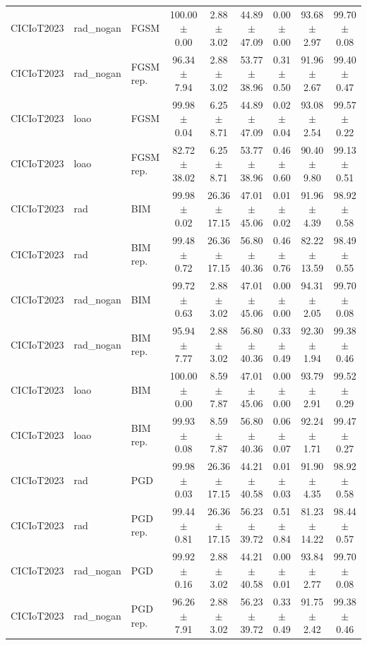 \begin{table}[t]
\begin{tabular}{lllcccccc}
CICIoT2023 & rad\_nogan & FGSM & 100.00 $\pm$ 0.00 & 2.88 $\pm$ 3.02 & 44.89 $\pm$ 47.09 & 0.00 $\pm$ 0.00 & 93.68 $\pm$ 2.97 & 99.70 $\pm$ 0.08 \\
CICIoT2023 & rad\_nogan & FGSM rep. & 96.34 $\pm$ 7.94 & 2.88 $\pm$ 3.02 & 53.77 $\pm$ 38.96 & 0.31 $\pm$ 0.50 & 91.96 $\pm$ 2.67 & 99.40 $\pm$ 0.47 \\
CICIoT2023 & loao & FGSM & 99.98 $\pm$ 0.04 & 6.25 $\pm$ 8.71 & 44.89 $\pm$ 47.09 & 0.02 $\pm$ 0.04 & 93.08 $\pm$ 2.54 & 99.57 $\pm$ 0.22 \\
CICIoT2023 & loao & FGSM rep. & 82.72 $\pm$ 38.02 & 6.25 $\pm$ 8.71 & 53.77 $\pm$ 38.96 & 0.46 $\pm$ 0.60 & 90.40 $\pm$ 9.80 & 99.13 $\pm$ 0.51 \\
CICIoT2023 & rad & BIM & 99.98 $\pm$ 0.02 & 26.36 $\pm$ 17.15 & 47.01 $\pm$ 45.06 & 0.01 $\pm$ 0.02 & 91.96 $\pm$ 4.39 & 98.92 $\pm$ 0.58 \\
CICIoT2023 & rad & BIM rep. & 99.48 $\pm$ 0.72 & 26.36 $\pm$ 17.15 & 56.80 $\pm$ 40.36 & 0.46 $\pm$ 0.76 & 82.22 $\pm$ 13.59 & 98.49 $\pm$ 0.55 \\
CICIoT2023 & rad\_nogan & BIM & 99.72 $\pm$ 0.63 & 2.88 $\pm$ 3.02 & 47.01 $\pm$ 45.06 & 0.00 $\pm$ 0.00 & 94.31 $\pm$ 2.05 & 99.70 $\pm$ 0.08 \\
CICIoT2023 & rad\_nogan & BIM rep. & 95.94 $\pm$ 7.77 & 2.88 $\pm$ 3.02 & 56.80 $\pm$ 40.36 & 0.33 $\pm$ 0.49 & 92.30 $\pm$ 1.94 & 99.38 $\pm$ 0.46 \\
CICIoT2023 & loao & BIM & 100.00 $\pm$ 0.00 & 8.59 $\pm$ 7.87 & 47.01 $\pm$ 45.06 & 0.00 $\pm$ 0.00 & 93.79 $\pm$ 2.91 & 99.52 $\pm$ 0.29 \\
CICIoT2023 & loao & BIM rep. & 99.93 $\pm$ 0.08 & 8.59 $\pm$ 7.87 & 56.80 $\pm$ 40.36 & 0.06 $\pm$ 0.07 & 92.24 $\pm$ 1.71 & 99.47 $\pm$ 0.27 \\
CICIoT2023 & rad & PGD & 99.98 $\pm$ 0.03 & 26.36 $\pm$ 17.15 & 44.21 $\pm$ 40.58 & 0.01 $\pm$ 0.03 & 91.90 $\pm$ 4.35 & 98.92 $\pm$ 0.58 \\
CICIoT2023 & rad & PGD rep. & 99.44 $\pm$ 0.81 & 26.36 $\pm$ 17.15 & 56.23 $\pm$ 39.72 & 0.51 $\pm$ 0.84 & 81.23 $\pm$ 14.22 & 98.44 $\pm$ 0.57 \\
CICIoT2023 & rad\_nogan & PGD & 99.92 $\pm$ 0.16 & 2.88 $\pm$ 3.02 & 44.21 $\pm$ 40.58 & 0.00 $\pm$ 0.01 & 93.84 $\pm$ 2.77 & 99.70 $\pm$ 0.08 \\
CICIoT2023 & rad\_nogan & PGD rep. & 96.26 $\pm$ 7.91 & 2.88 $\pm$ 3.02 & 56.23 $\pm$ 39.72 & 0.33 $\pm$ 0.49 & 91.75 $\pm$ 2.42 & 99.38 $\pm$ 0.46 \\

\end{tabular}
\end{table}
